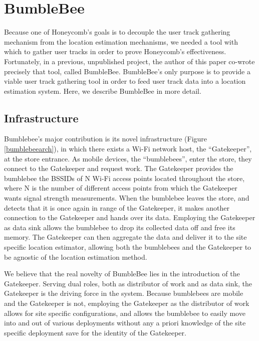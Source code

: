 \chapter{BumbleBee}
\label{bumblebee}
%

Because one of Honeycomb's goals is to decouple the user track gathering mechanism from the location estimation mechanisms, we needed a tool with which to gather user tracks in order to prove Honeycomb's effectiveness. Fortunately, in a previous, unpublished project, the author of this paper co-wrote precisely that tool, called BumbleBee. BumbleBee's only purpose is to provide a viable user track gathering tool in order to feed user track data into a location estimation system. Here, we describe BumbleBee in more detail.


\section{Infrastructure}
%

Bumblebee's major contribution is its novel infrastructure (Figure \ref{bumblebeearch}), in which there exists a Wi-Fi network host, the “Gatekeeper”, at the store entrance. As mobile devices, the “bumblebees”, enter the store, they connect to the Gatekeeper and request work. The Gatekeeper provides the bumblebee the BSSIDs of N Wi-Fi access points located throughout the store, where N is the number of different access points from which the Gatekeeper wants signal strength measurements. When the bumblebee leaves the store, and detects that it is once again in range of the Gatekeeper, it makes another connection to the Gatekeeper and hands over its data. Employing the Gatekeeper as data sink allows the bumblebee to drop its collected data off and free its memory. The Gatekeeper can then aggregate the data and deliver it to the site specific location estimator, allowing both the bumblebees and the Gatekeeper to be agnostic of the location estimation method.

We believe that the real novelty of BumbleBee lies in the introduction of the Gatekeeper. Serving dual roles, both as distributor of work and as data sink, the Gatekeeper is the driving force in the system. Because bumblebees are mobile and the Gatekeeper is not, employing the Gatekeeper as the distributor of work allows for site specific configurations, and allows the bumblebee to easily move into and out of various deployments without any a priori knowledge of the site specific deployment save for the identity of the Gatekeeper.


